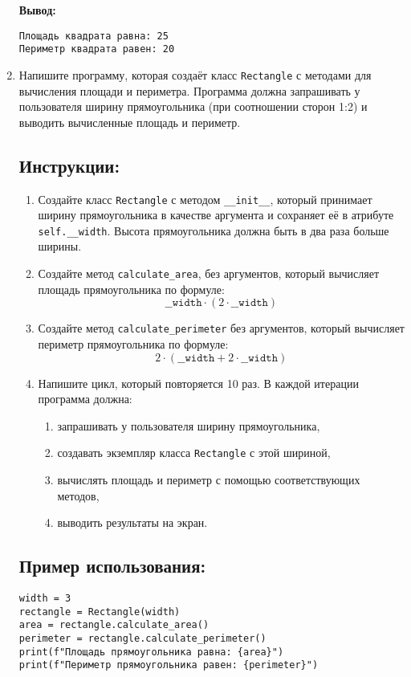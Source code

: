 \begin{enumerate}
\textbf{Вывод:}
\begin{verbatim}
Площадь квадрата равна: 25
Периметр квадрата равен: 20
\end{verbatim}

\item
Напишите программу, которая создаёт класс \texttt{Rectangle} с методами для вычисления площади
и периметра. Программа должна запрашивать у пользователя ширину прямоугольника
(при соотношении сторон 1:2) и выводить вычисленные площадь и периметр.

\subsection*{Инструкции:}
\begin{enumerate}
\item Создайте класс \texttt{Rectangle} с методом
\texttt{\_\_init\_\_}, который принимает ширину прямоугольника в
качестве аргумента и сохраняет её в атрибуте \texttt{self.\_\_width}.
Высота прямоугольника должна быть в два раза больше ширины.

\item Создайте метод \texttt{calculate\_area},
без аргументов, который вычисляет площадь прямоугольника по формуле:
\[
\texttt{\_\_width} \cdot (2 \cdot \texttt{\_\_width})
\]

\item Создайте метод \texttt{calculate\_perimeter} без аргументов,
который вычисляет периметр прямоугольника по формуле:
\[
2 \cdot (\texttt{\_\_width} + 2 \cdot \texttt{\_\_width})
\]

\item Напишите цикл, который повторяется 10 раз. В каждой итерации программа должна:
\begin{enumerate}
\item запрашивать у пользователя ширину прямоугольника,
\item создавать экземпляр класса \texttt{Rectangle} с этой шириной,
\item вычислять площадь и периметр с помощью соответствующих методов,
\item выводить результаты на экран.
\end{enumerate}
\end{enumerate}

\subsection*{Пример использования:}
\begin{verbatim}
width = 3
rectangle = Rectangle(width)
area = rectangle.calculate_area()
perimeter = rectangle.calculate_perimeter()
print(f"Площадь прямоугольника равна: {area}")
print(f"Периметр прямоугольника равен: {perimeter}")
\end{verbatim}


\end{enumerate}
